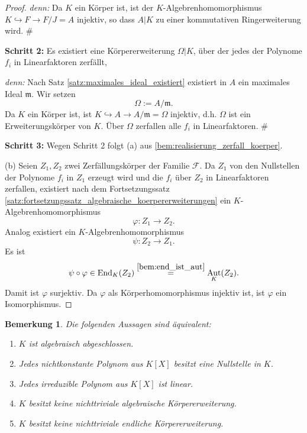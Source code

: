 \documentclass[a4paper, twoside, 11pt, ngerman]{report}
\DeclareMathOperator{\Aut}{Aut}
\theoremstyle{definistyle}
\newtheorem{bem}[satz]{Bemerkung}
\theoremstyle{remark}
\newenvironment{denn}%
  {\par\textit{denn:}}%
  {\hfill\#\par}
\begin{document}
\begin{proof}
\begin{denn}
Da $K$ ein Körper ist, ist der $K$-Algebrenhomomorphismus $K \hookrightarrow F\to F/J=A$ injektiv, so dass $A|K$ zu einer kommutativen Ringerweiterung wird.
\end{denn}
\textbf{Schritt 2:} Es existiert eine Körpererweiterung $\Omega|K$, über der jedes der Polynome $f_i$ in Linearfaktoren zerfällt,
\begin{denn}
Nach Satz \ref{satz:maximales_ideal_existiert} existiert in $A$ ein maximales Ideal $\mathfrak{m}$. Wir setzen
\[
\Omega := A/\mathfrak{m}.
\]
Da $K$ ein Körper ist, ist $K \hookrightarrow A \to A/\mathfrak{m} = \Omega$ injektiv, d.h. $\Omega$ ist ein Erweiterungskörper von $K$. Über $\Omega$ zerfallen alle $f_i$ in Linearfaktoren.
\end{denn}

\textbf{Schritt 3:} Wegen Schritt 2 folgt (a) aus \ref{bem:realisierung_zerfall_koerper}.

(b) Seien $Z_1, Z_2$ zwei Zerfällungskörper der Familie $\mathcal{F}$.  
Da $Z_1$ von den Nullstellen der Polynome $f_i$ in $Z_1$ erzeugt wird und die $f_i$ über $Z_2$ in Linearfaktoren zerfallen, existiert nach dem Fortsetzungssatz \ref{satz:fortsetzungssatz_algebraische_koerpererweiterungen} ein $K$-Algebren\-homomorphismus
\[
\varphi \colon Z_1 \to Z_2.
\]
Analog existiert ein $K$-Algebren\-homomorphismus
\[
\psi \colon Z_2 \to Z_1.
\]
Es ist
\[
\psi \circ \varphi \in \operatorname{End}_K(Z_2) \overset{\ref{bem:end_ist_aut}}{=} \Aut_K(Z_2).
\]
Damit ist $\varphi$ surjektiv. Da $\varphi$ als Körperhomomorphismus injektiv ist,
ist $\varphi$ ein Isomorphismus.
\end{proof}

\begin{bem}\label{bem:algebraisch_abgeschlossen}
Die folgenden Aussagen sind äquivalent:
\begin{enumerate}[label=(\roman*)]
\item $K$ ist algebraisch abgeschlossen.
\item Jedes nichtkonstante Polynom aus $K[X]$ besitzt eine Nullstelle in $K$.
\item Jedes irreduzible Polynom aus $K[X]$ ist linear.
\item $K$ besitzt keine nichttriviale algebraische Körpererweiterung.
\item $K$ besitzt keine nichttriviale endliche Körpererweiterung.
\end{enumerate}
\end{bem}
\end{document}
